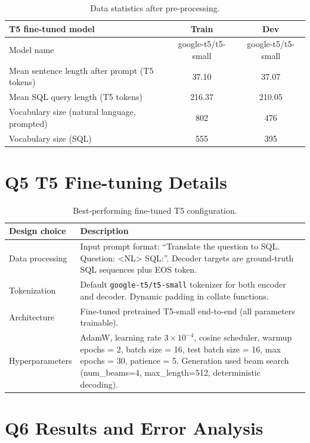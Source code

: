 \documentclass{article}
\begin{document}
\begin{table}[h!]
\centering
\begin{tabular}{lcc}
\toprule
\textbf{T5 fine-tuned model} & Train & Dev \\
\midrule
Model name & google-t5/t5-small & google-t5/t5-small \\
Mean sentence length after prompt (T5 tokens) & 37.10 & 37.07 \\
Mean SQL query length (T5 tokens) & 216.37 & 210.05 \\
Vocabulary size (natural language, prompted) & 802 & 476 \\
Vocabulary size (SQL) & 555 & 395 \\
\bottomrule
\end{tabular}
\caption{Data statistics after pre-processing.}
\label{tab:data_stats_after}
\end{table}

\newpage

\section*{Q5 T5 Fine-tuning Details}
\begin{table}[h!]
\centering
\begin{tabular}{p{3.5cm}p{10cm}}
\toprule
Design choice & Description \\
\midrule
Data processing & Input prompt format: ``Translate the question to SQL. Question: <NL> SQL:''.
Decoder targets are ground-truth SQL sequences plus EOS token. \\
Tokenization & Default \texttt{google-t5/t5-small} tokenizer for both encoder and decoder.
Dynamic padding in collate functions. \\
Architecture & Fine-tuned pretrained T5-small end-to-end (all parameters trainable). \\
Hyperparameters & AdamW, learning rate $3\times10^{-4}$, cosine scheduler, warmup epochs = 2,
batch size = 16, test batch size = 16, max epochs = 30, patience = 5. Generation used beam search
(num\_beams=4, max\_length=512, deterministic decoding). \\
\bottomrule
\end{tabular}
\caption{Best-performing fine-tuned T5 configuration.}
\label{tab:t5_results_ft}
\end{table}

\section*{Q6 Results and Error Analysis}
\end{document}
